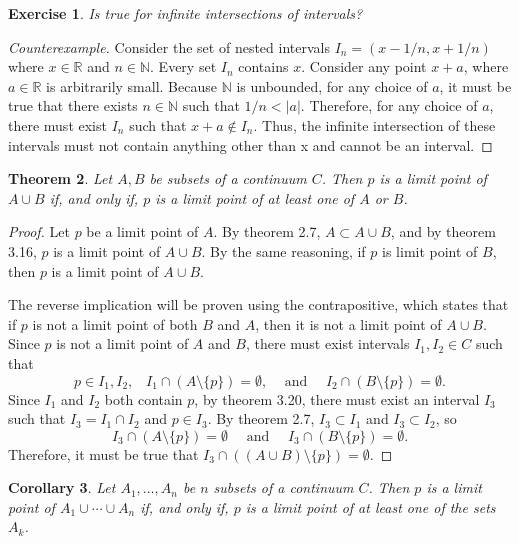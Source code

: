 \documentclass{amsart}
\newtheorem{theorem}{Theorem}
\newtheorem{corollary}[theorem]{Corollary}
\newtheorem{exercise}[theorem]{Exercise}
\newcommand{\N}{\mathbb N}
\newcommand{\R}{\mathbb R}
\newcommand{\1}{\mathds{1}}
\def \R {{\mathbb {R}}}
\def \N {{\mathbb {N}}}
\numberwithin{equation}{section}
\numberwithin{theorem}{section}
\begin{document}
\begin{exercise}
	Is  true for {\em infinite} intersections of intervals?
\end{exercise}

\begin{proof}[Counterexample]
	Consider the set of nested intervals $I_n = (x-1/n,x+1/n)$ where $x\in\R$ and $n\in\N$. Every set $I_n$ contains $x$. Consider any point $x+a$, where $a\in\R$ is arbitrarily small. Because $\N$ is unbounded, for any choice of $a$, it must be true that there exists $n\in\N$ such that $1/n<|a|$. Therefore, for any choice of $a$, there must exist $I_n$ such that $x+a\notin I_n$. Thus, the infinite intersection of these intervals must not contain anything other than x and cannot be an interval. 
\end{proof}

\begin{theorem}  Let $A, B$ be subsets of a continuum $C$.  Then $p$ is a limit point of $A \cup B$ if, and only if, $p$ is a limit point of at least one of $A$ or $B$.
\end{theorem}

\begin{proof}
	Let $p$ be a limit point of $A$. By theorem 2.7, $A\subset A\cup B$, and by theorem 3.16, $p$ is a limit point of $A\cup B$. By the same reasoning, if $p$ is limit point of $B$, then $p$ is a limit point of $A\cup B$. 
	
	The reverse implication will be proven using the contrapositive, which states that if $p$ is not a limit point of both $B$ and $A$, then it is not a limit point of $A\cup B$. Since $p$ is not a limit point of $A$ and $B$, there must exist intervals $I_1,I_2\in C$ such that $$p\in I_1,I_2 \text{,} \quad I_1 \cap (A\setminus \{p\}) =\emptyset \text{,} \quad \text{ and } \quad I_2 \cap (B\setminus \{p\}) =\emptyset.$$ Since $I_1$ and $I_2$ both contain $p$, by theorem 3.20, there must exist an interval $I_3$ such that $I_3 = I_1 \cap I_2$ and $p\in I_3$. By theorem 2.7, $I_3 \subset I_1$ and $I_3 \subset I_2$, so $$I_3 \cap (A\setminus \{p\}) =\emptyset \quad \text{ and } \quad I_3 \cap (B\setminus \{p\}) =\emptyset.$$ Therefore, it must be true that $I_3 \cap ((A\cup B)\setminus \{p\}) =\emptyset$.
\end{proof}
	
\begin{corollary}
	Let $A_1, \dotsc, A_n$ be $n$ subsets of a continuum $C$.  Then $p$ is a limit point of $A_1 \cup \dotsm \cup A_n$ if, and only if, $p$ is a limit point of at least one of the sets $A_k$.
\end{corollary}
\end{document}
